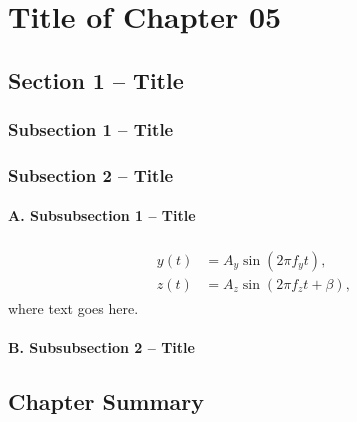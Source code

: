 \chapter{Title of Chapter 05 \label{chap:C5_TrajectoryGeneration}}


\section{Section 1 -- Title\label{sec:C5_SRSTrajectoryGeneration} }%

\subsection{Subsection 1 -- Title\label{subsec:C5_TrajectoryGenerationProcedure}}

\lipsum[1]   

\subsection{Subsection 2 -- Title\label{ssub:task-space_trajs}}

\subsubsection{A. Subsubsection 1 -- Title \label{subsec:C5_Sidewinding-Trajectory}}

\lipsum[1] 
\vspace{-4mm}
\begin{align}
	\begin{split}y\left(t\right) & =A_{y}\sin\left(2\pi f_{y}t\right),\\
		z\left(t\right) & =A_{z}\sin\left(2\pi f_{z}t+\beta\right),
	\end{split}
	& \label{eq:C5_sidewindingcurve}
\end{align}	
where text goes here.


\subsubsection{B. Subsubsection 2 -- Title\label{subsec:C5_SeperntineTrajectory}}


\section{Chapter Summary} \label{sec:C5_chapsummary}

\lipsum[1] 